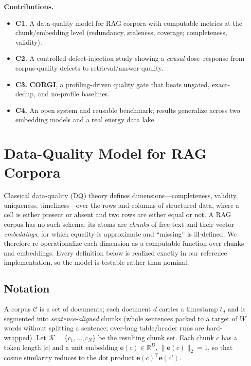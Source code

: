 \documentclass[conference]{IEEEtran}
\begin{document}
\noindent\textbf{Contributions.}
\begin{itemize}
  \item \textbf{C1.} A data-quality model for RAG corpora with computable metrics at the
        chunk/embedding level (redundancy, staleness, coverage; completeness, validity).
  \item \textbf{C2.} A controlled defect-injection study showing a \emph{causal}
        dose--response from corpus-quality defects to retrieval/answer quality.
  \item \textbf{C3.} \textbf{CORGI}, a profiling-driven quality gate that beats ungated,
        exact-dedup, and no-profile baselines.
  \item \textbf{C4.} An open system and reusable benchmark; results generalize across two
        embedding models and a real energy data lake.
\end{itemize}

\section{Data-Quality Model for RAG Corpora}\label{sec:model}
Classical data-quality (DQ) theory defines dimensions---completeness, validity,
uniqueness, timeliness---over the rows and columns of structured data, where a cell is
either present or absent and two rows are either equal or not. A RAG corpus has no such
schema: its atoms are \emph{chunks} of free text and their vector \emph{embeddings}, for
which equality is approximate and ``missing'' is ill-defined. We therefore re-operationalize
each dimension as a computable function over chunks and embeddings. Every definition below is
realized exactly in our reference implementation, so the model is testable rather than
nominal.

\subsection{Notation}
A corpus $\mathcal{C}$ is a set of documents; each document $d$ carries a timestamp $t_d$ and
is segmented into \emph{sentence-aligned} chunks (whole sentences packed to a target of $W$
words without splitting a sentence; over-long table/header runs are hard-wrapped). Let
$\mathcal{K}=\{c_1,\dots,c_N\}$ be the resulting chunk set. Each chunk $c$ has a token length
$\lvert c\rvert$ and a unit embedding $\mathbf{e}(c)\in\mathbb{R}^{D}$,
$\lVert\mathbf{e}(c)\rVert_2=1$, so that cosine similarity reduces to the dot product
$\mathbf{e}(c)^{\!\top}\mathbf{e}(c')$.
\end{document}
